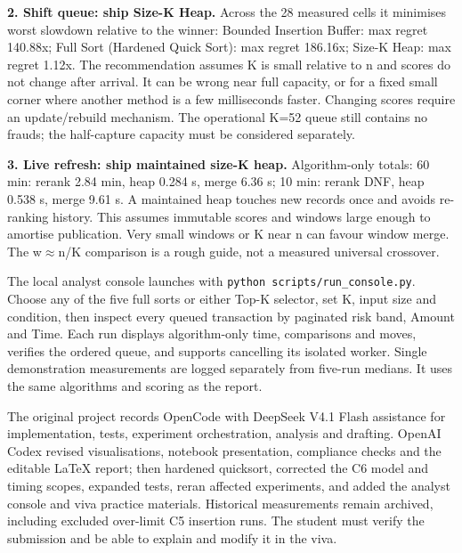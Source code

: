 \documentclass[10pt,a4paper]{article}
\newcommand{\subheading}[1]{\par\vspace{3pt}{\fontsize{9}{11}\selectfont\bfseries #1}\par}
\begin{document}
\textbf{2. Shift queue: ship Size-K Heap.} Across the 28 measured cells it minimises worst slowdown relative to the winner: Bounded Insertion Buffer: max regret 140.88x; Full Sort (Hardened Quick Sort): max regret 186.16x; Size-K Heap: max regret 1.12x. The recommendation assumes K is small relative to n and scores do not change after arrival. It can be wrong near full capacity, or for a fixed small corner where another method is a few milliseconds faster. Changing scores require an update/rebuild mechanism. The operational K=52 queue still contains no frauds; the half-capture capacity must be considered separately.\par

\textbf{3. Live refresh: ship maintained size-K heap.} Algorithm-only totals: 60 min: rerank 2.84 min, heap 0.284 s, merge 6.36 s; 10 min: rerank DNF, heap 0.538 s, merge 9.61 s. A maintained heap touches new records once and avoids re-ranking history. This assumes immutable scores and windows large enough to amortise publication. Very small windows or K near n can favour window merge. The w\(\approx\)n/K comparison is a rough guide, not a measured universal crossover.\par

\subheading{Bonus: Analyst console}

The local analyst console launches with \texttt{python scripts/run\_\allowbreak{}console.py}. Choose any of the five full sorts or either Top-K selector, set K, input size and condition, then inspect every queued transaction by paginated risk band, Amount and Time. Each run displays algorithm-only time, comparisons and moves, verifies the ordered queue, and supports cancelling its isolated worker. Single demonstration measurements are logged separately from five-run medians. It uses the same algorithms and scoring as the report.\par

\subheading{AI-use disclosure}

The original project records OpenCode with DeepSeek V4.1 Flash assistance for implementation, tests, experiment orchestration, analysis and drafting. OpenAI Codex revised visualisations, notebook presentation, compliance checks and the editable LaTeX report; then hardened quicksort, corrected the C6 model and timing scopes, expanded tests, reran affected experiments, and added the analyst console and viva practice materials. Historical measurements remain archived, including excluded over-limit C5 insertion runs. The student must verify the submission and be able to explain and modify it in the viva.\par
\end{document}
